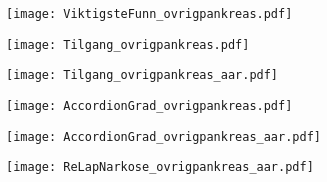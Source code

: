 \documentclass[norsk,a4paper]{article}\usepackage[]{graphicx}\usepackage[]{color}
\begin{document}
\begin{figure}[ht]
\centering
\texttt{[image: ViktigsteFunn\_ovrigpankreas.pdf]}
\caption{}
\end{figure}

\begin{figure}[ht]
\centering
\texttt{[image: Tilgang\_ovrigpankreas.pdf]}
\caption{}
\end{figure}

\begin{figure}[ht]
\centering
\texttt{[image: Tilgang\_ovrigpankreas\_aar.pdf]}
\caption{}
\end{figure}


\begin{figure}[ht]
\centering
\texttt{[image: AccordionGrad\_ovrigpankreas.pdf]}
\caption{}
\end{figure}

\begin{figure}[ht]
\centering
\texttt{[image: AccordionGrad\_ovrigpankreas\_aar.pdf]}
\caption{}
\end{figure}

\begin{figure}[ht]
\centering
\texttt{[image: ReLapNarkose\_ovrigpankreas\_aar.pdf]}
\caption{}
\end{figure}
\end{document}
